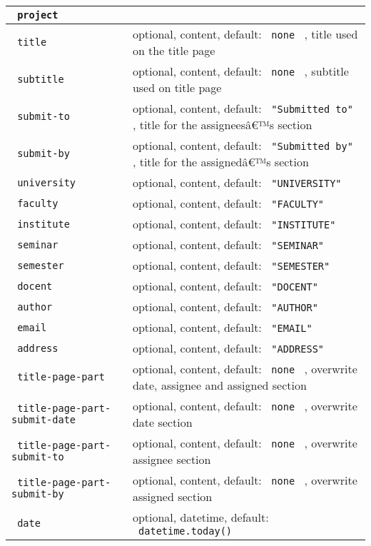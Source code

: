 \begin{longtable}[]{@{}ll@{}}
\toprule\noalign{}
\texttt{\ project\ } & \\
\midrule\noalign{}
\endhead
\bottomrule\noalign{}
\endlastfoot
\texttt{\ title\ } & optional, content, default: \texttt{\ none\ } ,
title used on the title page \\
\texttt{\ subtitle\ } & optional, content, default: \texttt{\ none\ } ,
subtitle used on title page \\
\texttt{\ submit-to\ } & optional, content, default:
\texttt{\ "Submitted\ to"\ } , title for the assigneesâ€™s section \\
\texttt{\ submit-by\ } & optional, content, default:
\texttt{\ "Submitted\ by"\ } , title for the assignedâ€™s section \\
\texttt{\ university\ } & optional, content, default:
\texttt{\ "UNIVERSITY"\ } \\
\texttt{\ faculty\ } & optional, content, default:
\texttt{\ "FACULTY"\ } \\
\texttt{\ institute\ } & optional, content, default:
\texttt{\ "INSTITUTE"\ } \\
\texttt{\ seminar\ } & optional, content, default:
\texttt{\ "SEMINAR"\ } \\
\texttt{\ semester\ } & optional, content, default:
\texttt{\ "SEMESTER"\ } \\
\texttt{\ docent\ } & optional, content, default:
\texttt{\ "DOCENT"\ } \\
\texttt{\ author\ } & optional, content, default:
\texttt{\ "AUTHOR"\ } \\
\texttt{\ email\ } & optional, content, default: \texttt{\ "EMAIL"\ } \\
\texttt{\ address\ } & optional, content, default:
\texttt{\ "ADDRESS"\ } \\
\texttt{\ title-page-part\ } & optional, content, default:
\texttt{\ none\ } , overwrite date, assignee and assigned section \\
\texttt{\ title-page-part-submit-date\ } & optional, content, default:
\texttt{\ none\ } , overwrite date section \\
\texttt{\ title-page-part-submit-to\ } & optional, content, default:
\texttt{\ none\ } , overwrite assignee section \\
\texttt{\ title-page-part-submit-by\ } & optional, content, default:
\texttt{\ none\ } , overwrite assigned section \\
\texttt{\ date\ } & optional, datetime, default:
\texttt{\ datetime.today()\ } \\

\end{longtable}

